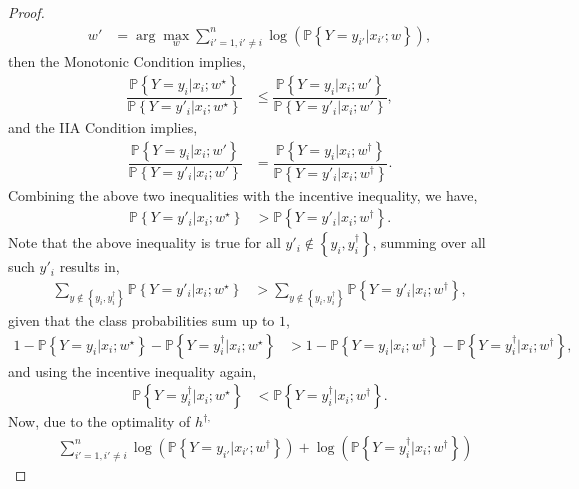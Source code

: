 \documentclass{article}
\begin{document}
\begin{proof}
\begin{align*}
w' &= \arg\displaystyle\max_{w} \displaystyle\sum_{i'=1, i' \neq  i}^{n} \log\left(\mathbb{P}\left\{Y = y_{i'} | x_{i'} ; w\right\}\right),
\end{align*}
then the Monotonic Condition implies,
\begin{align*}
\dfrac{\mathbb{P}\left\{Y = y_{i} | x_{i} ; w^\star \right\}}{\mathbb{P}\left\{Y = y'_{i} | x_{i} ; w^\star \right\}} &\leq  \dfrac{\mathbb{P}\left\{Y = y_{i} | x_{i} ; w'\right\}}{\mathbb{P}\left\{Y = y'_{i} | x_{i} ; w'\right\}},
\end{align*}
and the IIA Condition implies,
\begin{align*}
\dfrac{\mathbb{P}\left\{Y = y_{i} | x_{i} ; w'\right\}}{\mathbb{P}\left\{Y = y'_{i} | x_{i} ; w'\right\}} &= \dfrac{\mathbb{P}\left\{Y = y_{i} | x_{i} ; w^{\dagger}\right\}}{\mathbb{P}\left\{Y = y'_{i} | x_{i} ; w^{\dagger}\right\}}.
\end{align*}
Combining the above two inequalities with the incentive inequality, we have,
\begin{align*}
\mathbb{P}\left\{Y = y'_{i} | x_{i} ; w^\star \right\} &> \mathbb{P}\left\{Y = y'_{i} | x_{i} ; w^{\dagger}\right\}.
\end{align*}
Note that the above inequality is true for all $y'_{i} \notin \left\{y_{i}, y^{\dagger}_{i}\right\}$, summing over all such $y'_{i}$ results in,
\begin{align*}
\displaystyle\sum_{y \notin \left\{y_{i}, y^{\dagger}_{i}\right\}} \mathbb{P}\left\{Y = y'_{i} | x_{i} ; w^\star \right\} &> \displaystyle\sum_{y \notin \left\{y_{i}, y^{\dagger}_{i}\right\}} \mathbb{P}\left\{Y = y'_{i} | x_{i} ; w^{\dagger}\right\},
\end{align*}
given that the class probabilities sum up to $1$,
\begin{align*}
1 - \mathbb{P}\left\{Y = y_{i} | x_{i} ; w^\star \right\} - \mathbb{P}\left\{Y = y^{\dagger}_{i} | x_{i} ; w^\star \right\} &> 1 - \mathbb{P}\left\{Y = y_{i} | x_{i} ; w^{\dagger}\right\} - \mathbb{P}\left\{Y = y^{\dagger}_{i} | x_{i} ; w^{\dagger}\right\},
\end{align*}
and using the incentive inequality again,
\begin{align*}
\mathbb{P}\left\{Y = y^{\dagger}_{i} | x_{i} ; w^\star \right\} &< \mathbb{P}\left\{Y = y^{\dagger}_{i} | x_{i} ; w^{\dagger}\right\}.
\end{align*}
Now, due to the optimality of $h^{\dagger,}$
\begin{align*}
&  \displaystyle\sum_{i'=1, i' \neq  i}^{n} \log\left(\mathbb{P}\left\{Y = y_{i'} | x_{i'} ; w^{\dagger}\right\}\right) + \log\left(\mathbb{P}\left\{Y = y^{\dagger}_{i} | x_{i} ; w^{\dagger}\right\}\right)

\end{align*}
\end{proof}
\end{document}
